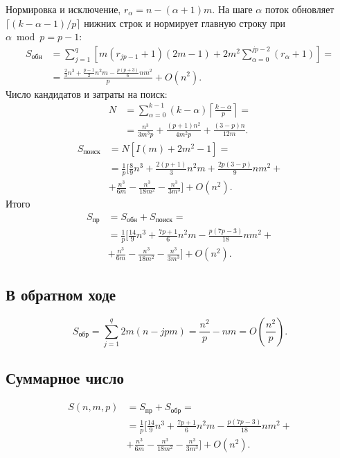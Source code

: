\documentclass[a4paper,12pt]{article}
\newcommand{\br}[1]{\left(#1\right)}
\begin{document}
Нормировка и исключение, $r_\alpha = n - (\alpha + 1)m$. На шаге $\alpha$ поток обновляет $\lceil(k - \alpha - 1)/p\rceil$ нижних строк и нормирует главную строку при $\alpha \bmod p = p - 1$:
\begin{align*}
    S_{\text{обн}}
    & = \sum_{j = 1}^{q}\left[m(r_{jp - 1} + 1)(2m - 1)
        + 2m^2\sum_{\alpha = 0}^{jp - 2}(r_\alpha + 1)\right] = \\
    & = \frac{\frac{2}{3}n^3 + \frac{p - 1}{2}n^2m
        - \frac{p(p + 3)}{6}nm^2}{p} + O(n^2).
\end{align*}
Число кандидатов и затраты на поиск:
\begin{align*}
    N & = \sum_{\alpha = 0}^{k - 1}(k - \alpha)
        \left\lceil\frac{k - \alpha}{p}\right\rceil = \\
    & = \frac{n^3}{3m^3p} + \frac{(p + 1)n^2}{4m^2p}
        + \frac{(3 - p)n}{12m}.
\end{align*}
\begin{align*}
    S_{\text{поиск}} & = N\left[I(m) + 2m^2 - 1\right] = \\
    & = \frac{1}{p}\Biggl[\frac{8}{9}n^3 + \frac{2(p + 1)}{3}n^2m
        + \frac{2p(3 - p)}{9}nm^2 + \\
    & + \frac{n^3}{6m} - \frac{n^3}{18m^2}
        - \frac{n^3}{3m^3}\Biggr] + O(n^2).
\end{align*}
Итого
\begin{align*}
    S_{\text{пр}} & = S_{\text{обн}} + S_{\text{поиск}} = \\
    & = \frac{1}{p}\Biggl[\frac{14}{9}n^3 + \frac{7p + 1}{6}n^2m
        - \frac{p(7p - 3)}{18}nm^2 + \\
    & + \frac{n^3}{6m} - \frac{n^3}{18m^2}
        - \frac{n^3}{3m^3}\Biggr] + O(n^2).
\end{align*}

\subsection{В обратном ходе}
\[
    S_{\text{обр}} = \sum_{j = 1}^{q}2m(n - jpm)
        = \frac{n^2}{p} - nm = O\br{\frac{n^2}{p}}.
\]

\subsection{Суммарное число}
\begin{align*}
    S(n,m,p) & = S_{\text{пр}} + S_{\text{обр}} = \\
    & = \frac{1}{p}\Biggl[\frac{14}{9}n^3 + \frac{7p + 1}{6}n^2m
        - \frac{p(7p - 3)}{18}nm^2 + \\
    & + \frac{n^3}{6m} - \frac{n^3}{18m^2}
        - \frac{n^3}{3m^3}\Biggr] + O(n^2).
\end{align*}
\end{document}
